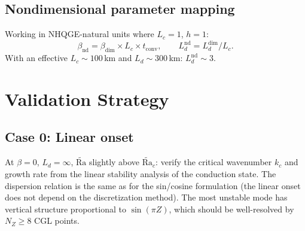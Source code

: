 \documentclass[11pt]{article}
\newcommand{\Rav}{\widetilde{\mathrm{Ra}}}
\newcommand{\Ld}{L_d}
\newcommand{\Lc}{L_c}
\begin{document}
\subsection{Nondimensional parameter mapping}

Working in NHQGE-natural units where $\Lc = 1$, $h = 1$:
\begin{equation}
\beta_{\mathrm{nd}} = \beta_{\mathrm{dim}} \times \Lc \times t_{\mathrm{conv}}, \qquad \Ld^{\mathrm{nd}} = \Ld^{\mathrm{dim}}/\Lc.
\end{equation}
With an effective $\Lc \sim 100$\,km and $\Ld \sim 300$\,km: $\Ld^{\mathrm{nd}} \sim 3$.





\section{Validation Strategy}
\label{sec:validation}

\subsection{Case 0: Linear onset}

At $\beta = 0$, $\Ld = \infty$, $\Rav$ slightly above $\Rav_c$: verify the critical wavenumber $k_c$ and growth rate from the linear stability analysis of the conduction state. The dispersion relation is the same as for the sin/cosine formulation (the linear onset does not depend on the discretization method). The most unstable mode has vertical structure proportional to $\sin(\pi Z)$, which should be well-resolved by $N_Z \ge 8$ CGL points.
\end{document}
